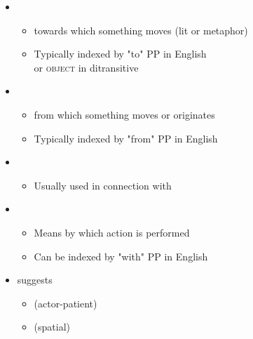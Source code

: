 \documentclass[headrule,footrule]{foils}
\begin{document}
\begin{itemize}
\item  {}
  \begin{itemize}
  \item  towards which something moves (lit or metaphor)
 \item  Typically indexed by "to" PP in English 
   \\ or \textsc{object} in ditransitive
  \end{itemize}
  \begin{exe}
  \ex{}
  \ex{}
  \end{exe}
\item  {}
 \begin{itemize}
 \item  from which something moves or originates
 \item  Typically indexed by "from" PP in English
 \end{itemize}
  \begin{exe}
 \ex{}  
\end{exe}
\newpage
\item  {}
  \begin{itemize}
  \item  Usually used in connection with 
  \end{itemize}
  \begin{exe}
  \ex{}
  \ex{}
\end{exe}
\item  {}
  \begin{itemize}
  \item  Means by which action is performed
  \item  Can be indexed by "with" PP in English
  \end{itemize}
  \begin{exe}
    \ex{}
  \end{exe}
\end{itemize}


\begin{itemize}
\item \citet{Jackendoff:1990} suggests
  \begin{itemize}
  \item {} (actor-patient)
    \\ 
  \item {} (spatial)
  \\ 
\end{itemize}
\end{itemize}
\end{document}
